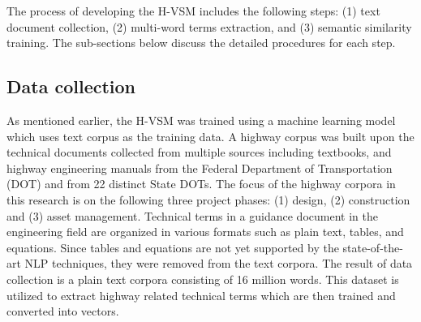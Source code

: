 \documentclass[Journal, InsideFigs, DoubleSpace]{ascelike} %
\begin{document}
%
%

The process of developing the H-VSM includes the following steps: (1) text document collection, (2) multi-word terms extraction, and (3) semantic similarity training. The sub-sections below discuss the detailed procedures for each step. 
%
\subsection{Data collection}
As mentioned earlier, the H-VSM was trained using a machine learning model which uses text corpus as the training data. A highway corpus was built upon the technical documents collected from multiple sources including textbooks, and highway engineering manuals from the Federal Department of Transportation (DOT) and from 22 distinct State DOTs. The focus of the highway corpora in this research is on the following three project phases: (1) design, (2) construction and (3) asset management. Technical terms in a guidance document in the engineering field are organized in various formats such as plain text, tables, and equations. Since tables and equations are not yet supported by the state-of-the-art NLP techniques, they were removed from the text corpora. The result of data collection is a plain text corpora consisting of 16 million words. This dataset is utilized to extract highway related technical terms which are then trained and converted into vectors.
%
\end{document}
